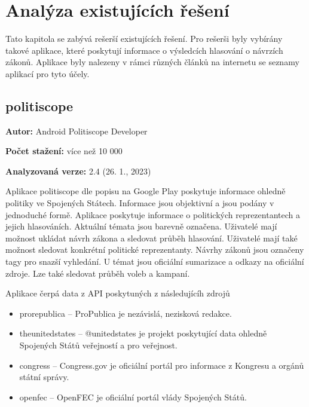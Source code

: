 \chapter{Analýza existujících řešení}

\begin{chapterabstract}
Tato kapitola se zabývá rešerší existujících řešení. Pro rešerši byly vybírány takové \linebreak aplikace, které poskytují informace o výsledcích hlasování o návrzích zákonů. Aplikace byly nalezeny v rámci různých článků na internetu se seznamy aplikací pro tyto účely.
\end{chapterabstract}

\section{politiscope}

\begin{description}
	\item \textbf{Autor:} Android Politiscope Developer
	\item \textbf{Počet stažení:} více než 10 000
	\item \textbf{Analyzovaná verze:} 2.4 (26. 1., 2023)
\end{description}

\noindent Aplikace politiscope \cite{politiscope} dle popisu na Google Play poskytuje informace ohledně politiky ve Spojených Státech. Informace jsou objektivní a jsou podány v jednoduché formě. Aplikace poskytuje informace o politických reprezentantech a jejich hlasováních. Aktuální témata jsou barevně označena. Uživatelé mají možnost ukládat návrh zákona a sledovat průběh hlasování. Uživatelé mají také možnost sledovat konkrétní politické reprezentanty. Návrhy zákonů jsou označeny tagy pro snazší vyhledání. U témat jsou oficiální sumarizace a odkazy na oficiální zdroje. Lze také sledovat průběh voleb a kampaní.

Aplikace čerpá data z API poskytuných z následujícíh zdrojů

\begin{itemize}
	\item prorepublica \cite{propublica} -- ProPublica je nezávislá, nezisková redakce.
	\item theunitedstates \cite{unitedstates} -- @unitedstates je projekt poskytující data ohledně Spojených Států veřejností a pro veřejnost.
	\item congress \cite{congress} -- Congress.gov je oficiální portál pro informace z Kongresu a orgánů státní správy.
	\item openfec \cite{openfec} -- OpenFEC je oficiální portál vlády Spojených Států.
\end{itemize}

